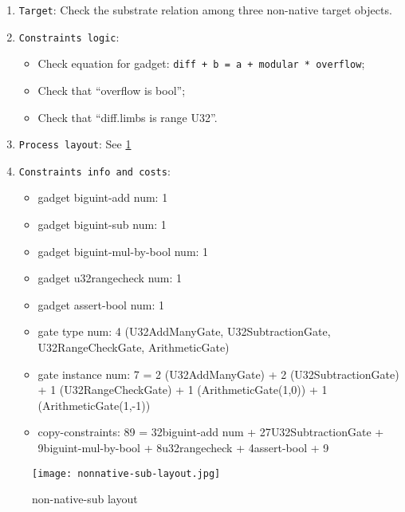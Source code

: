 
\begin{enumerate}
    \item \verb|Target|: Check the substrate relation among three non-native target objects.
    \item \verb|Constraints logic|:
    \begin{itemize}
        \item Check equation for gadget: \verb|diff + b = a + modular * overflow|;
        \item Check that ``overflow is bool'';
        \item Check that ``diff.limbs is range U32''.
    \end{itemize}
    \item \verb|Process layout|: See \ref{fig:non-native-sub-layout}
    \item \verb|Constraints info and costs|:
    \begin{itemize}
        \item gadget biguint-add num: 1
        \item gadget biguint-sub num: 1
        \item gadget biguint-mul-by-bool num: 1
        \item gadget u32rangecheck num: 1
        \item gadget assert-bool num: 1
        \item gate type num: 4 (U32AddManyGate, U32SubtractionGate, U32RangeCheckGate, ArithmeticGate)
        \item gate instance num: 7 = 2 (U32AddManyGate) + 2 (U32SubtractionGate) + 1 (U32RangeCheckGate) + 1 (ArithmeticGate(1,0)) + 1 (ArithmeticGate(1,-1))
        \item copy-constraints: 89 = 32{biguint-add num} + 27{U32SubtractionGate} + 9{biguint-mul-by-bool} + 8{u32rangecheck} + 4{assert-bool} + 9
    \end{itemize}
\end{enumerate}

\begin{figure}[!ht]
    \centering
    \texttt{[image: nonnative-sub-layout.jpg]}
    \caption{non-native-sub layout}
    \label{fig:non-native-sub-layout}
\end{figure}